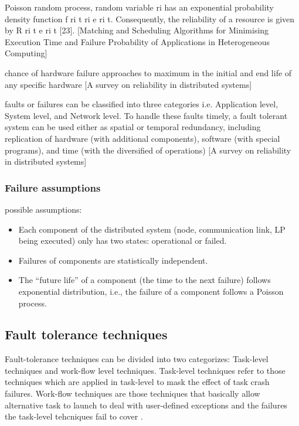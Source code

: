 \documentclass{cslthse-msc}
\begin{document}
 Poisson random process, random variable  ri has an exponential probability density function f ri  t     ri e  ri t. Consequently, the reliability of a resource is given by R ri  t    e  ri t [23]. [Matching and Scheduling Algorithms for Minimising Execution Time and Failure Probability of Applications in Heterogeneous Computing]
 
 chance of hardware failure approaches to maximum in the initial and end life of any specific hardware [A survey on reliability in distributed systems]
 
 faults or failures can be classified into three categories i.e. Application level, System level, and Network level. To handle these faults timely, a fault tolerant system can be used either as spatial or temporal redundancy, including replication of hardware (with additional components), software (with special programs), and time (with the diversified of operations) [A survey on reliability in distributed systems]%
 
 \subsubsection{Failure assumptions}
 possible assumptions:
 \begin{itemize}
  \item  Each component of the distributed system (node, communication link, LP being executed) only has two states: operational or failed.
 \item Failures of components are statistically independent.
 \item The “future life” of a component (the time to the next failure) follows exponential distribution, i.e., the failure of a component follows a Poisson process.
 \end{itemize}

 
 
 \subsection{Fault tolerance techniques}
Fault-tolerance techniques can be divided into two categorizes:
Task-level techniques and work-flow level techniques.
Task-level techniques refer to those techniques which are applied in task-level to mask the effect of task crash failures. Work-flow techniques are those techniques that basically allow alternative task to launch to deal with user-defined exceptions and the failures the task-level tehcniques fail to cover \cite{gridWorkflow}.
\end{document}
